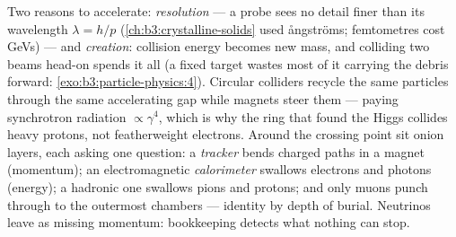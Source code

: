 \begin{remark}\label{rem:b3:particle-physics:machines}
Two reasons to accelerate: \emph{resolution} --- a probe sees no
detail finer than its wavelength $\lambda = h/p$
(\cref{ch:b3:crystalline-solids} used ångströms; femtometres
cost \unit{GeV}s) --- and \emph{creation}: collision energy
becomes new mass, and colliding two beams head-on spends it all
(a fixed target wastes most of it carrying the debris forward:
\cref{exo:b3:particle-physics:4}). Circular colliders recycle
the same particles through the same accelerating gap while
magnets steer them --- paying synchrotron radiation
$\propto\gamma^4$, which is why the ring that found the Higgs
collides heavy protons, not featherweight electrons. Around the
crossing point sit onion layers, each asking one question: a
\emph{tracker} bends charged paths in a magnet (momentum); an
electromagnetic \emph{calorimeter} swallows electrons and
photons (energy); a hadronic one swallows pions and protons;
and only muons punch through to the outermost chambers ---
identity by depth of burial. Neutrinos leave as missing
momentum: bookkeeping detects what nothing can stop.
\end{remark}

